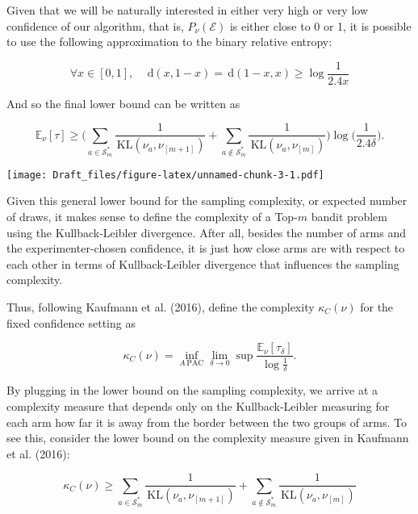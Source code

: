 \documentclass[12pt,]{article}
\newcommand{\KL}{\,\text{KL}}
\newcommand{\der}{\,\text{d}}
\begin{document}
Given that we will be naturally interested in either very high or very
low confidence of our algorithm, that is, \(P_\nu(\mathcal{E})\) is
either close to 0 or 1, it is possible to use the following
approximation to the binary relative entropy:

\begin{equation}\label{bre_approx}
\forall x \in [0,1], \quad \der(x,1-x) = \der(1-x,x) \geq \log \frac{1}{2.4x}
\end{equation}

And so the final lower bound can be written as

\begin{equation*}
\mathbb{E}_{\nu}[\tau] \geq \Big( \sum_{a \in \mathcal{S}_m^*} \frac{1}{\KL(\nu_a, \nu_{[m+1]})} + \sum_{a \notin \mathcal{S}_m^*} \frac{1}{\KL(\nu_a, \nu_{[m]})} \Big) \log \big(\frac{1}{2.4\delta} \big).
\end{equation*}

\texttt{[image: Draft\_files/figure-latex/unnamed-chunk-3-1.pdf]}

Given this general lower bound for the sampling complexity, or expected
number of draws, it makes sense to define the complexity of a Top-\(m\)
bandit problem using the Kullback-Leibler divergence. After all, besides
the number of arms and the experimenter-chosen confidence, it is just
how close arms are with respect to each other in terms of
Kullback-Leibler divergence that influences the sampling complexity.

Thus, following Kaufmann et al. (2016), define the complexity
\(\kappa_C(\nu)\) for the fixed confidence setting as

\begin{equation}
\kappa_C(\nu) = \inf_{A \, \text{PAC}} \lim_{\delta \to 0} \sup \frac{\mathbb{E}_{\nu}[\tau_{\delta}]}{\log \frac{1}{\delta}}.
\end{equation}

By plugging in the lower bound on the sampling complexity, we arrive at
a complexity measure that depends only on the Kullback-Leibler measuring
for each arm how far it is away from the border between the two groups
of arms. To see this, consider the lower bound on the complexity measure
given in Kaufmann et al. (2016):

\begin{equation*}
\kappa_C(\nu) \geq \sum_{a \in \mathcal{S}_m^*} \frac{1}{\KL(\nu_a, \nu_{[m+1]})} + \sum_{a \notin \mathcal{S}_m^*} \frac{1}{\KL(\nu_a, \nu_{[m]})}
\end{equation*}
\end{document}
